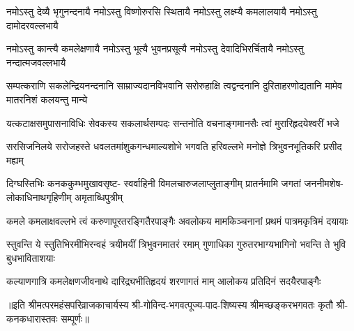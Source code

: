 \fourlineindentedshloka
{नमोऽस्तु देव्यै भृगुनन्दनायै}
{नमोऽस्तु विष्णोरुरसि स्थितायै}
{नमोऽस्तु लक्ष्म्यै कमलालयायै}
{नमोऽस्तु दामोदरवल्लभायै}

\fourlineindentedshloka
{नमोऽस्तु कान्त्यै कमलेक्षणायै}
{नमोऽस्तु भूत्यै भुवनप्रसूत्यै}
{नमोऽस्तु देवादिभिरर्चितायै}
{नमोऽस्तु नन्दात्मजवल्लभायै}

\fourlineindentedshloka
{सम्पत्कराणि सकलेन्द्रियनन्दनानि}
{साम्राज्यदानविभवानि सरोरुहाक्षि}
{त्वद्वन्दनानि दुरिताहरणोद्यतानि}
{मामेव मातरनिशं कलयन्तु मान्ये}

\fourlineindentedshloka
{यत्कटाक्षसमुपासनाविधिः}
{सेवकस्य सकलार्थसम्पदः}
{सन्तनोति वचनाङ्गमानसैः}
{त्वां मुरारिहृदयेश्वरीं भजे}

\fourlineindentedshloka
{सरसिजनिलये सरोजहस्ते}
{धवलतमांशुकगन्धमाल्यशोभे}
{भगवति हरिवल्लभे मनोज्ञे}
{त्रिभुवनभूतिकरि प्रसीद मह्यम्}

\fourlineindentedshloka
{दिग्घस्तिभिः कनककुम्भमुखावसृष्ट-}
{स्वर्वाहिनी विमलचारुजलाप्लुताङ्गीम्}
{प्रातर्नमामि जगतां जननीमशेष-}
{लोकाधिनाथगृहिणीम् अमृताब्धिपुत्रीम्}

\fourlineindentedshloka
{कमले कमलाक्षवल्लभे त्वं}
{करुणापूरतरङ्गितैरपाङ्गैः}
{अवलोकय मामकिञ्चनानां}
{प्रथमं पात्रमकृत्रिमं दयायाः}

\fourlineindentedshloka
{स्तुवन्ति ये स्तुतिभिरमीभिरन्वहं}
{त्रयीमयीं त्रिभुवनमातरं रमाम्}
{गुणाधिका गुरुतरभाग्यभागिनो}
{भवन्ति ते भुवि बुधभाविताशयाः}

{कल्याणगात्रि कमलेक्षणजीवनाथे}
{दारिद्र्यभीतिहृदयं शरणागतं माम्}
{आलोकय प्रतिदिनं सदयैरपाङ्गैः}

॥इति श्रीमत्परमहंसपरिव्राजकाचार्यस्य श्री-गोविन्द-भगवत्पूज्य-पाद-शिष्यस्य
श्रीमच्छङ्करभगवतः कृतौ श्री-कनकधारास्तवः सम्पूर्णः॥